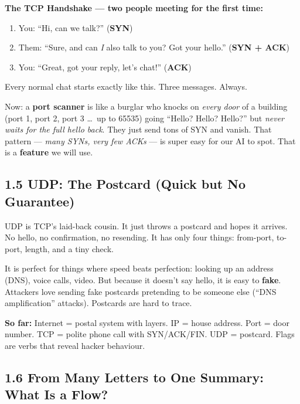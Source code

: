 \documentclass[11pt,a4paper]{article}
\begin{document}
\begin{examplebox}
\textbf{The TCP Handshake --- two people meeting for the first time:}

\begin{enumerate}[label=\textbf{\arabic*.},leftmargin=1.8em,itemsep=2pt]
  \item You: ``Hi, can we talk?'' (\textbf{SYN})
  \item Them: ``Sure, and can \emph{I} also talk to you? Got your hello.'' (\textbf{SYN + ACK})
  \item You: ``Great, got your reply, let's chat!'' (\textbf{ACK})
\end{enumerate}

Every normal chat starts exactly like this. Three messages. Always.

Now: a \textbf{port scanner} is like a burglar who knocks on \emph{every door}
of a building (port 1, port 2, port 3 \dots\ up to 65535) going
``Hello? Hello? Hello?'' but \emph{never waits for the full hello back}.
They just send tons of SYN and vanish. That pattern --- \emph{many SYNs, very
few ACKs} --- is super easy for our AI to spot. That is a \textbf{feature} we
will use.
\end{examplebox}

\subsection{1.5 UDP: The Postcard (Quick but No Guarantee)}
\label{sec:udp}

UDP is TCP's laid-back cousin. It just throws a postcard and hopes it arrives.
No hello, no confirmation, no resending. It has only four things: from-port,
to-port, length, and a tiny check.

It is perfect for things where speed beats perfection: looking up an address
(DNS), voice calls, video. But because it doesn't say hello, it is easy to
\textbf{fake}. Attackers love sending fake postcards pretending to be someone
else (``DNS amplification'' attacks). Postcards are hard to trace.

\begin{recap}
\textbf{So far:} Internet = postal system with layers. IP = house address.
Port = door number. TCP = polite phone call with SYN/ACK/FIN. UDP = postcard.
Flags are verbs that reveal hacker behaviour.
\end{recap}

\subsection{1.6 From Many Letters to One Summary: What Is a Flow?}
\label{sec:flow}
\end{document}
